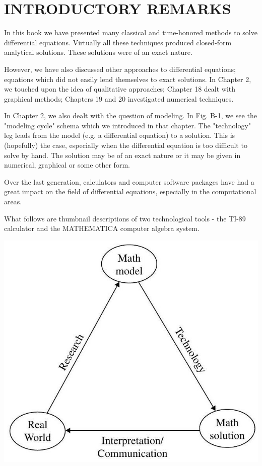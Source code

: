 \documentclass[10pt]{article}
\begin{document}
\section*{INTRODUCTORY REMARKS}
In this book we have presented many classical and time-honored methods to solve differential equations. Virtually all these techniques produced closed-form analytical solutions. These solutions were of an exact nature.

However, we have also discussed other approaches to differential equations; equations which did not easily lend themselves to exact solutions. In Chapter 2, we touched upon the idea of qualitative approaches; Chapter 18 dealt with graphical methods; Chapters 19 and 20 investigated numerical techniques.

In Chapter 2, we also dealt with the question of modeling. In Fig. B-1, we see the "modeling cycle" schema which we introduced in that chapter. The "technology" leg leads from the model (e.g. a differential equation) to a solution. This is (hopefully) the case, especially when the differential equation is too difficult to solve by hand. The solution may be of an exact nature or it may be given in numerical, graphical or some other form.

Over the last generation, calculators and computer software packages have had a great impact on the field of differential equations, especially in the computational areas.

What follows are thumbnail descriptions of two technological tools - the TI-89 calculator and the MATHEMATICA computer algebra system.

\begin{center}
\includegraphics[max width=\textwidth]{2024_04_03_5bb5b4275a64cb9887d1g-354}
\end{center}
\end{document}

